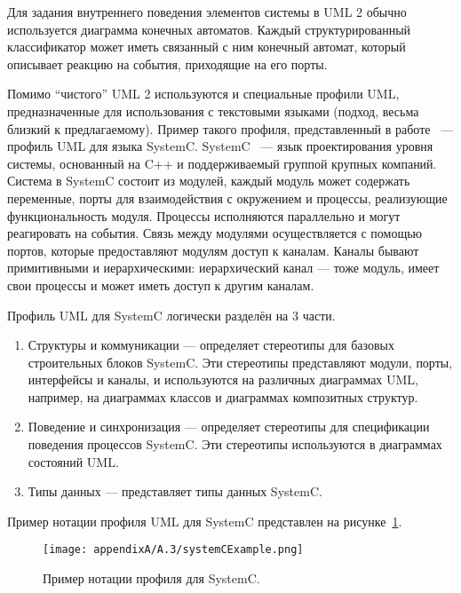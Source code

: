 Для задания внутреннего поведения элементов системы в UML 2 обычно используется диаграмма 
конечных автоматов. Каждый структурированный классификатор может иметь связанный с 
ним конечный автомат, который описывает реакцию на события, приходящие на его порты.

Помимо "`чистого"' UML 2 используются и специальные профили UML, предназначенные для 
использования с текстовыми языками (подход, весьма близкий к предлагаемому). Пример 
такого профиля, представленный в работе~\cite{riccobene2005uml} --- профиль UML для языка SystemC. 
SystemC~\cite{arnout2000systemc} --- язык проектирования уровня системы, основанный на C++ и поддерживаемый группой крупных компаний. 
Система в SystemC состоит из модулей, каждый модуль может содержать переменные, порты 
для взаимодействия с окружением и процессы, реализующие функциональность модуля. Процессы
исполняются параллельно и могут реагировать на события. Связь между модулями осуществляется 
с помощью портов, которые предоставляют модулям доступ к каналам. Каналы бывают примитивными 
и иерархическими: иерархический канал --- тоже модуль, имеет свои процессы и может иметь 
доступ к другим каналам.

Профиль UML для SystemC логически разделён на 3 части.
\begin{enumerate}
	\item Структуры и коммуникации --- определяет стереотипы для базовых строительных 
		блоков SystemC. Эти стереотипы представляют модули, порты, интерфейсы и каналы, 
		и используются на различных диаграммах UML, например, на диаграммах классов и 
		диаграммах композитных структур.
	\item Поведение и синхронизация --- определяет стереотипы для спецификации поведения 
		процессов SystemC. Эти стереотипы используются в диаграммах состояний UML.
	\item Типы данных --- представляет типы данных SystemC.
\end{enumerate}

Пример нотации профиля UML для SystemC представлен на рисунке~\ref{image:systemCExample}.

\begin{figure} [ht]
	\begin{center}
		\texttt{[image: appendixA/A.3/systemCExample.png]}
		\caption{Пример нотации профиля для SystemC.}
		\label{image:systemCExample}
	\end{center}
\end{figure}

